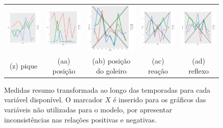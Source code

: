 \documentclass[review]{elsarticle}
\begin{document}
\begin{figure}
\begin{tabular}{ccccc}
    \includegraphics[width=25mm]{pique_result_trans}  & \includegraphics[width=25mm]{pos_result_trans_media} & \includegraphics[width=25mm]{posicion_gl_result_trans} &     \includegraphics[width=25mm]{reacao_result_trans}&
  \includegraphics[width=25mm]{reflexos_result_trans}     \\
 \scriptsize{(z) pique} & \scriptsize{(aa) posição}& \scriptsize{(ab) posição do goleiro} & \scriptsize{(ac) reação} & \scriptsize{(ad) reflexo}  \\[3pt]

\end{tabular}
    \caption[\scriptsize{Medidas resumo transformado.}]{\scriptsize{Medidas resumo transformada ao longo das temporadas para cada variável disponível. O marcador $X$ é inserido para os gráficos das variáveis não utilizadas para o modelo, por apresentar inconsistências nas relações positivas e negativas.}}
    \label{fig:medresumotrans}
\end{figure}
\end{document}
